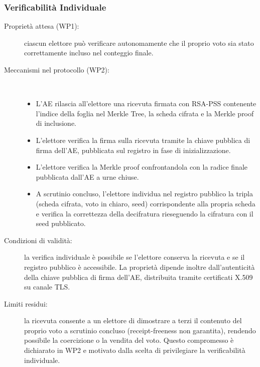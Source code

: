 \documentclass[12pt,a4paper]{article}
\begin{document}
\subsubsection{Verificabilità Individuale}
\begin{description}
  \item[Proprietà attesa (WP1):] ciascun elettore può verificare autonomamente che il proprio voto sia stato correttamente incluso nel conteggio finale.
  \item[Meccanismi nel protocollo (WP2):] \
    \begin{itemize}
      \item L'AE rilascia all'elettore una ricevuta firmata con RSA-PSS contenente l'indice della foglia nel Merkle Tree, la scheda cifrata e la Merkle proof di inclusione.
      \item L'elettore verifica la firma sulla ricevuta tramite la chiave pubblica di firma dell'AE, pubblicata sul registro in fase di inizializzazione.
      \item L'elettore verifica la Merkle proof confrontandola con la radice finale pubblicata dall'AE a urne chiuse.
      \item A scrutinio concluso, l'elettore individua nel registro pubblico la tripla (scheda cifrata, voto in chiaro, seed) corrispondente alla propria scheda e verifica la correttezza della decifratura rieseguendo la cifratura con il seed pubblicato.
    \end{itemize}
  \item[Condizioni di validità:] la verifica individuale è possibile se l'elettore conserva la ricevuta e se il registro pubblico è accessibile. La proprietà dipende inoltre dall'autenticità della chiave pubblica di firma dell'AE, distribuita tramite certificati X.509 su canale TLS.
  \item[Limiti residui:] la ricevuta consente a un elettore di dimostrare a terzi il contenuto del proprio voto a scrutinio concluso (receipt-freeness non garantita), rendendo possibile la coercizione o la vendita del voto. Questo compromesso è dichiarato in WP2 e motivato dalla scelta di privilegiare la verificabilità individuale.
\end{description}
\end{document}
